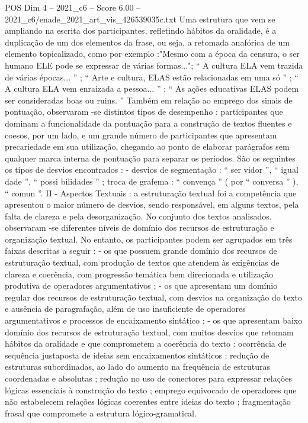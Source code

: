 \begin{textsample}{POS Dim 4 – 2021\_c6 – Score 6.00 – 2021\_c6/enade\_2021\_art\_vis\_426539035c.txt}
Uma estrutura que vem se ampliando na escrita dos participantes, refletindo hábitos da oralidade, é a duplicação de um dos elementos da frase, ou seja, a retomada anafórica de um elemento topicalizado, como por exemplo :"Mesmo com a época da censura, o ser humano ELE pode se expressar de várias formas..."; “ A cultura ELA vem trazida de várias épocas... ” ; “ Arte e cultura, ELAS estão relacionadas em uma só ” ; “ A cultura ELA vem enraizada a pessoa... ” ; “ As ações educativas ELAS podem ser consideradas boas ou ruins. ” Também em relação ao emprego dos sinais de pontuação, observaram -se distintos tipos de desempenho : participantes que dominam a funcionalidade da pontuação para a construção de textos fluentes e coesos, por um lado, e um grande número de participantes que apresentam precariedade em sua utilização, chegando ao ponto de elaborar parágrafos sem qualquer marca interna de pontuação para separar os períodos.
São os seguintes os tipos de desvios encontrados : - desvios de segmentação : “ ser vidor ”, “ igual dade ”, “ possi bilidades ” ; troca de grafema : “ convença ” ( por “ conversa ” ), “ comun ”.
II - Aspectos Textuais : a estruturação textual foi a competência que apresentou o maior número de desvios, sendo responsável, em alguns textos, pela falta de clareza e pela desorganização.
No conjunto dos textos analisados, observaram -se diferentes níveis de domínio dos recursos de estruturação e organização textual.
No entanto, os participantes podem ser agrupados em três faixas descritas a seguir : - os que possuem grande domínio dos recursos de estruturação textual, com produção de textos que atendem às exigências de clareza e coerência, com progressão temática bem direcionada e utilização produtiva de operadores argumentativos ; - os que apresentam um domínio regular dos recursos de estruturação textual, com desvios na organização do texto e ausência de paragrafação, além de uso insuficiente de operadores argumentativos e processos de encaixamento sintático ; - os que apresentam baixo domínio dos recursos de estruturação textual, com muitos desvios que retomam hábitos da oralidade e que comprometem a coerência do texto : ocorrência de sequência justaposta de ideias sem encaixamentos sintáticos ; redução de estruturas subordinadas, ao lado do aumento na frequência de estruturas coordenadas e absolutas ; redução no uso de conectores para expressar relações lógicas essenciais à construção do texto ; emprego equivocado de operadores que não estabelecem relações lógicas coerentes entre ideias do texto ; fragmentação frasal que compromete a estrutura lógico-gramatical.

\end{textsample}
